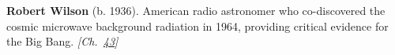 \nobelphysics \textbf{Robert Wilson} (b. 1936). American radio astronomer who co-discovered the cosmic microwave background radiation in 1964, providing critical evidence for the Big Bang. \emph{[Ch.~\hyperref[ch:nearflatuniverse]{43}]}

